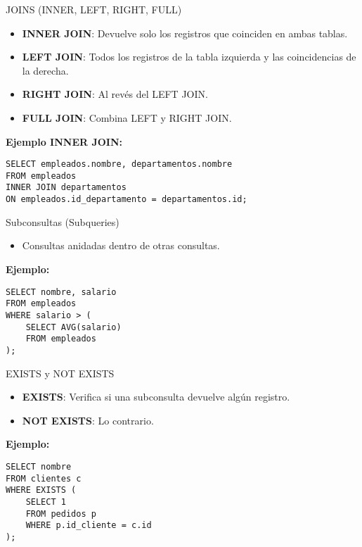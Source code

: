 \documentclass[spanish]{beamer}
\begin{document}
\begin{frame}{JOINS (INNER, LEFT, RIGHT, FULL)}
    \begin{itemize}
        \item \textbf{INNER JOIN}: Devuelve solo los registros que coinciden en ambas tablas.
        \item \textbf{LEFT JOIN}: Todos los registros de la tabla izquierda y las coincidencias de la derecha.
        \item \textbf{RIGHT JOIN}: Al revés del LEFT JOIN.
        \item \textbf{FULL JOIN}: Combina LEFT y RIGHT JOIN.
    \end{itemize}
    \vspace{0.3cm}
    \textbf{Ejemplo INNER JOIN:}
    \begin{verbatim}
SELECT empleados.nombre, departamentos.nombre
FROM empleados
INNER JOIN departamentos
ON empleados.id_departamento = departamentos.id;
    \end{verbatim}
\end{frame}

\begin{frame}{Subconsultas (Subqueries)}
    \begin{itemize}
        \item Consultas anidadas dentro de otras consultas.
    \end{itemize}
    \vspace{0.3cm}
    \textbf{Ejemplo:}
    \begin{verbatim}
SELECT nombre, salario
FROM empleados
WHERE salario > (
    SELECT AVG(salario)
    FROM empleados
);
    \end{verbatim}
\end{frame}

\begin{frame}{EXISTS y NOT EXISTS}
    \begin{itemize}
        \item \textbf{EXISTS}: Verifica si una subconsulta devuelve algún registro.
        \item \textbf{NOT EXISTS}: Lo contrario.
    \end{itemize}
    \vspace{0.3cm}
    \textbf{Ejemplo:}
    \begin{verbatim}
SELECT nombre
FROM clientes c
WHERE EXISTS (
    SELECT 1
    FROM pedidos p
    WHERE p.id_cliente = c.id
);
    \end{verbatim}
\end{frame}
\end{document}
